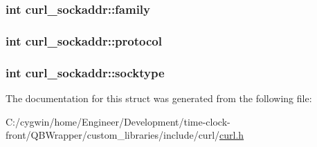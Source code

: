 \subsubsection[{family}]{\setlength{\rightskip}{0pt plus 5cm}int curl\+\_\+sockaddr\+::family}\label{structcurl__sockaddr_ad5406982faaa070b7c928686ed31fdae}
\hypertarget{structcurl__sockaddr_ab59abd90c680d1f37217c3f65ea58a02}{}
\subsubsection[{protocol}]{\setlength{\rightskip}{0pt plus 5cm}int curl\+\_\+sockaddr\+::protocol}\label{structcurl__sockaddr_ab59abd90c680d1f37217c3f65ea58a02}
\hypertarget{structcurl__sockaddr_a2c6c2c2083f3436c8b46c7d658be9aca}{}
\subsubsection[{socktype}]{\setlength{\rightskip}{0pt plus 5cm}int curl\+\_\+sockaddr\+::socktype}\label{structcurl__sockaddr_a2c6c2c2083f3436c8b46c7d658be9aca}


The documentation for this struct was generated from the following file\+:\begin{DoxyCompactItemize}
\item 
C\+:/cygwin/home/\+Engineer/\+Development/time-\/clock-\/front/\+Q\+B\+Wrapper/custom\+\_\+libraries/include/curl/\hyperlink{curl_8h}{curl.\+h}\end{DoxyCompactItemize}
